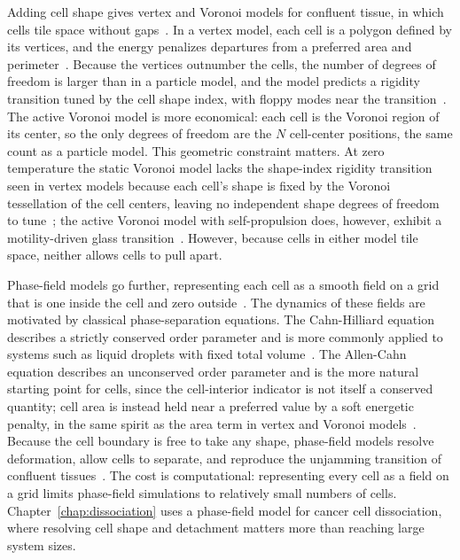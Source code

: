 Adding cell shape gives vertex and Voronoi models for confluent tissue, in which cells tile space without gaps~\cite{bi2015density, bi2016motility, henkes2020dense, park2015unjamming}.
In a vertex model, each cell is a polygon defined by its vertices, and the energy penalizes departures from a preferred area and perimeter~\cite{fletcher2014vertex}.
Because the vertices outnumber the cells, the number of degrees of freedom is larger than in a particle model, and the model predicts a rigidity transition tuned by the cell shape index, with floppy modes near the transition~\cite{bi2015density, park2015unjamming, lawson2021jamming}.
The active Voronoi model is more economical: each cell is the Voronoi region of its center, so the only degrees of freedom are the $N$ cell-center positions, the same count as a particle model.
This geometric constraint matters.
At zero temperature the static Voronoi model lacks the shape-index rigidity transition seen in vertex models because each cell's shape is fixed by the Voronoi tessellation of the cell centers, leaving no independent shape degrees of freedom to tune~\cite{sussman2018no}; the active Voronoi model with self-propulsion does, however, exhibit a motility-driven glass transition~\cite{bi2016motility}.
However, because cells in either model tile space, neither allows cells to pull apart.

Phase-field models go further, representing each cell as a smooth field on a grid that is one inside the cell and zero outside~\cite{camley2014polarity, palmieri2015multiple, loewe2020solid, perez2024deposited, zadeh2024inferring, chiang2024multiphase}.
The dynamics of these fields are motivated by classical phase-separation equations.
The Cahn-Hilliard equation describes a strictly conserved order parameter and is more commonly applied to systems such as liquid droplets with fixed total volume~\cite{cahn1958free, negro2023yield}.
The Allen-Cahn equation describes an unconserved order parameter and is the more natural starting point for cells, since the cell-interior indicator is not itself a conserved quantity; cell area is instead held near a preferred value by a soft energetic penalty, in the same spirit as the area term in vertex and Voronoi models~\cite{loewe2020solid, negro2023yield}.
Because the cell boundary is free to take any shape, phase-field models resolve deformation, allow cells to separate, and reproduce the unjamming transition of confluent tissues~\cite{loewe2020solid, chiang2024multiphase}.
The cost is computational: representing every cell as a field on a grid limits phase-field simulations to relatively small numbers of cells.
Chapter~\ref{chap:dissociation} uses a phase-field model for cancer cell dissociation, where resolving cell shape and detachment matters more than reaching large system sizes.

